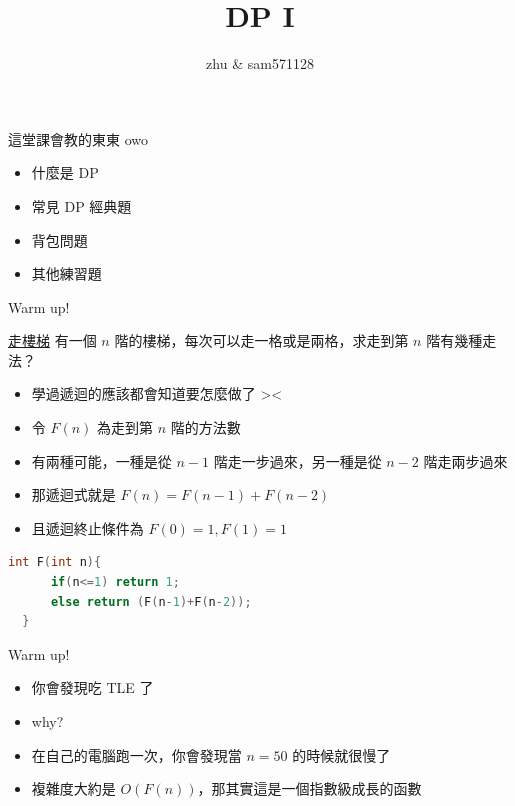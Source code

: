 \documentclass[aspectratio=169]{beamer}
\title{DP I}
\author{zhu \& sam571128}
\date[附中延平競程讀書會]
\begin{document}
    \begin{frame}
        \titlepage
    \end{frame}

    \begin{frame}{這堂課會教的東東 owo}
        \begin{itemize}
            \item 什麼是 DP
            \item 常見 DP 經典題
            \item 背包問題
            \item 其他練習題
        \end{itemize}
    \end{frame}

    \begin{frame}[fragile]{Warm up!}
        \begin{block}{\href{https://leetcode.com/problems/climbing-stairs/}{走樓梯}}
            有一個 $n$ 階的樓梯，每次可以走一格或是兩格，求走到第 $n$ 階有幾種走法？
        \end{block}
        \begin{itemize}
            \item<2-> 學過遞迴的應該都會知道要怎麼做了 >< \pause
            \item<3-> 令 $F(n)$ 為走到第 $n$ 階的方法數 \pause
            \item<3-> 有兩種可能，一種是從 $n-1$ 階走一步過來，另一種是從 $n-2$ 階走兩步過來 \pause
            \item<4-> 那遞迴式就是 $F(n) = F(n-1) + F(n-2)$ \pause
            \item<5-> 且遞迴終止條件為 $F(0) = 1, F(1) = 1$ \pause
        \end{itemize} 
        \begin{lstlisting}[language=C++, basicstyle= \ttfamily \small]
  int F(int n){
      if(n<=1) return 1;
      else return (F(n-1)+F(n-2));
  }
        \end{lstlisting}
    \end{frame}
    \begin{frame}{Warm up!}
        \begin{itemize}
            \item 你會發現吃 TLE 了
            \item<2-> why?
            \item<3-> 在自己的電腦跑一次，你會發現當 $n = 50$ 的時候就很慢了
            \item<4-> 複雜度大約是 $O(F(n))$，那其實這是一個指數級成長的函數
        \end{itemize}
    \end{frame}
    
\end{document}
